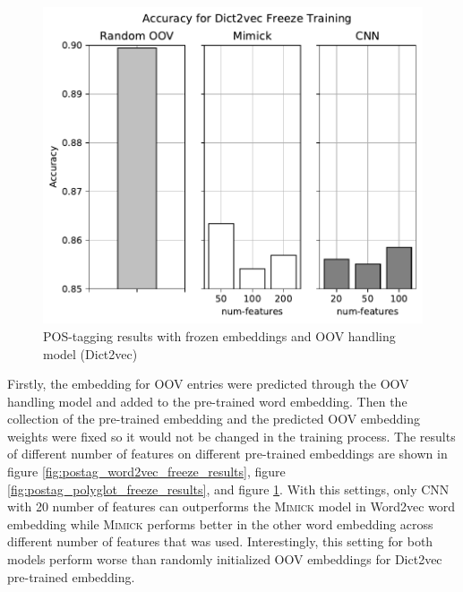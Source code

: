       \begin{figure}[H]
        \centering
        \includegraphics[width=0.8\linewidth]{images/freeze_dict2vec.pdf}
        \caption{POS-tagging results with frozen embeddings and OOV handling model (Dict2vec)}
        \label{fig:postag_dict2vec_freeze_results}
      \end{figure}
      Firstly, the embedding for OOV entries were predicted through
      the OOV handling model and added to the pre-trained word
      embedding. Then the collection of the pre-trained embedding and
      the predicted OOV embedding weights were fixed so it would not
      be changed in the training process. The results of different
      number of features on different pre-trained embeddings are shown
      in figure \ref{fig:postag_word2vec_freeze_results}, figure
      \ref{fig:postag_polyglot_freeze_results}, and figure
      \ref{fig:postag_dict2vec_freeze_results}. With this settings,
      only CNN with 20 number of features can outperforms the
      \textsc{Mimick} model in Word2vec word embedding while
      \textsc{Mimick} performs better in the other word embedding
      across different number of features that was used.
      Interestingly, this setting for both models perform worse than
      randomly initialized OOV embeddings for Dict2vec pre-trained
      embedding.
      
